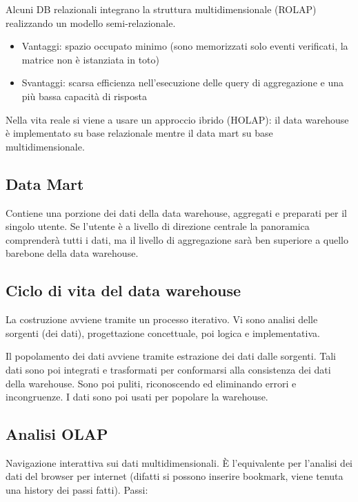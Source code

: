 Alcuni DB relazionali integrano la struttura multidimensionale (ROLAP)
realizzando un modello semi-relazionale.

\begin{itemize}

\item
  Vantaggi: spazio occupato minimo (sono memorizzati solo eventi
  verificati, la matrice non è istanziata in toto)
\item
  Svantaggi: scarsa efficienza nell'esecuzione delle query di
  aggregazione e una più bassa capacità di risposta
\end{itemize}

Nella vita reale si viene a usare un approccio ibrido (HOLAP): il data
warehouse è implementato su base relazionale mentre il data mart su base
multidimensionale.

\subsection{Data Mart}\label{data-mart}

Contiene una porzione dei dati della data warehouse, aggregati e
preparati per il singolo utente. Se l'utente è a livello di direzione
centrale la panoramica comprenderà tutti i dati, ma il livello di
aggregazione sarà ben superiore a quello barebone della data warehouse.

\subsection{Ciclo di vita del data
warehouse}\label{ciclo-di-vita-del-data-warehouse}

La costruzione avviene tramite un processo iterativo. Vi sono analisi
delle sorgenti (dei dati), progettazione concettuale, poi logica e
implementativa.

Il popolamento dei dati avviene tramite estrazione dei dati dalle
sorgenti. Tali dati sono poi integrati e trasformati per conformarsi
alla consistenza dei dati della warehouse. Sono poi puliti, riconoscendo
ed eliminando errori e incongruenze. I dati sono poi usati per popolare
la warehouse.

\subsection{Analisi OLAP}\label{analisi-olap}

Navigazione interattiva sui dati multidimensionali. È l'equivalente per
l'analisi dei dati del browser per internet (difatti si possono inserire
bookmark, viene tenuta una history dei passi fatti). Passi:


